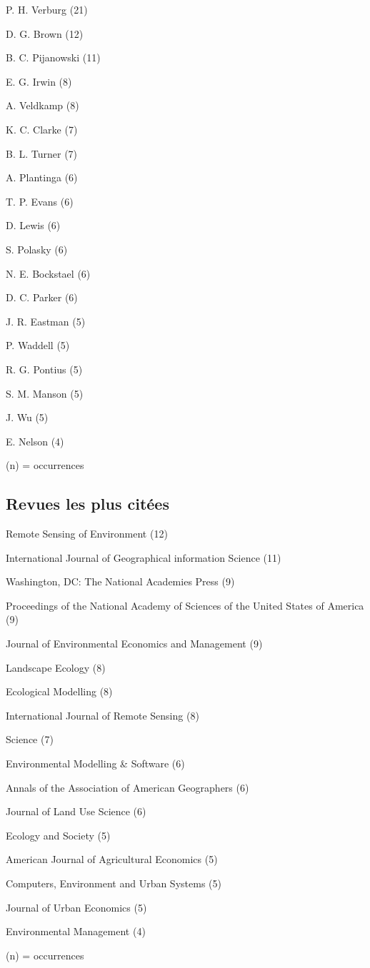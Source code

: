 \item P. H. Verburg (21)
\item D. G. Brown (12)
\item B. C. Pijanowski (11)
\item E. G. Irwin (8)
\item A. Veldkamp (8)
\item K. C. Clarke (7)
\item B. L. Turner (7)
\item A. Plantinga (6)
\item T. P. Evans (6)
\item D. Lewis (6)
\item S. Polasky (6)
\item N. E. Bockstael (6)
\item D. C. Parker (6)
\item J. R. Eastman (5)
\item P. Waddell (5)
\item R. G. Pontius (5)
\item S. M. Manson (5)
\item J. Wu (5)
\item E. Nelson (4)

\stopitemize

(n) = occurrences
\stopcolumns

\subsection
{Revues les plus citées}

\startitemize[n]

\item Remote Sensing of Environment (12)
\item International Journal of Geographical information Science (11)
\item Washington, DC: The National Academies Press (9)
\item Proceedings of the National Academy of Sciences of the United States of America (9)
\item Journal of Environmental Economics and Management (9)
\item Landscape Ecology (8)
\item Ecological Modelling (8)
\item International Journal of Remote Sensing (8)
\item Science (7)
\item Environmental Modelling \& Software (6)
\item Annals of the Association of American Geographers (6)
\item Journal of Land Use Science (6)
\item Ecology and Society (5)
\item American Journal of Agricultural Economics (5)
\item Computers, Environment and Urban Systems (5)
\item Journal of Urban Economics (5)
\item Environmental Management (4)

\stopitemize

(n) = occurrences
